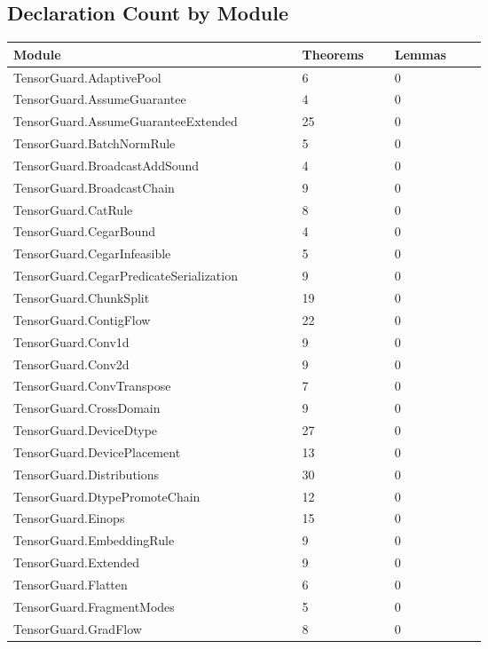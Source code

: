 \documentclass[10pt]{article}
\begin{document}
\subsection{Declaration Count by Module}
\begin{longtable}{|p{0.50\linewidth}|p{0.16\linewidth}|p{0.16\linewidth}|}
\hline
\textbf{Module} & \textbf{Theorems} & \textbf{Lemmas} \\
\hline
TensorGuard.AdaptivePool & 6 & 0 \\
\hline
TensorGuard.AssumeGuarantee & 4 & 0 \\
\hline
TensorGuard.AssumeGuaranteeExtended & 25 & 0 \\
\hline
TensorGuard.BatchNormRule & 5 & 0 \\
\hline
TensorGuard.BroadcastAddSound & 4 & 0 \\
\hline
TensorGuard.BroadcastChain & 9 & 0 \\
\hline
TensorGuard.CatRule & 8 & 0 \\
\hline
TensorGuard.CegarBound & 4 & 0 \\
\hline
TensorGuard.CegarInfeasible & 5 & 0 \\
\hline
TensorGuard.CegarPredicateSerialization & 9 & 0 \\
\hline
TensorGuard.ChunkSplit & 19 & 0 \\
\hline
TensorGuard.ContigFlow & 22 & 0 \\
\hline
TensorGuard.Conv1d & 9 & 0 \\
\hline
TensorGuard.Conv2d & 9 & 0 \\
\hline
TensorGuard.ConvTranspose & 7 & 0 \\
\hline
TensorGuard.CrossDomain & 9 & 0 \\
\hline
TensorGuard.DeviceDtype & 27 & 0 \\
\hline
TensorGuard.DevicePlacement & 13 & 0 \\
\hline
TensorGuard.Distributions & 30 & 0 \\
\hline
TensorGuard.DtypePromoteChain & 12 & 0 \\
\hline
TensorGuard.Einops & 15 & 0 \\
\hline
TensorGuard.EmbeddingRule & 9 & 0 \\
\hline
TensorGuard.Extended & 9 & 0 \\
\hline
TensorGuard.Flatten & 6 & 0 \\
\hline
TensorGuard.FragmentModes & 5 & 0 \\
\hline
TensorGuard.GradFlow & 8 & 0 \\
\hline

\end{longtable}
\end{document}

